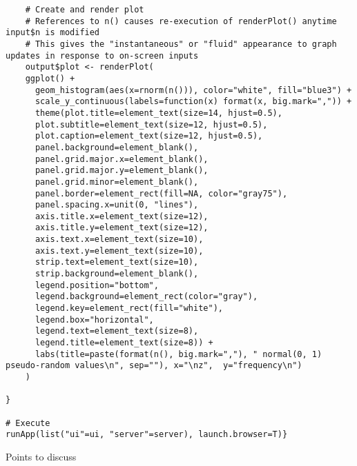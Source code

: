 \documentclass[10pt, letterpaper]{article}
\begin{document}
\begin{spacing}{1.0}
\begin{verbatim}
    # Create and render plot
    # References to n() causes re-execution of renderPlot() anytime input$n is modified
    # This gives the "instantaneous" or "fluid" appearance to graph updates in response to on-screen inputs
    output$plot <- renderPlot(
    ggplot() +
      geom_histogram(aes(x=rnorm(n())), color="white", fill="blue3") +
      scale_y_continuous(labels=function(x) format(x, big.mark=",")) +
      theme(plot.title=element_text(size=14, hjust=0.5),
      plot.subtitle=element_text(size=12, hjust=0.5),
      plot.caption=element_text(size=12, hjust=0.5),
      panel.background=element_blank(),
      panel.grid.major.x=element_blank(),
      panel.grid.major.y=element_blank(),
      panel.grid.minor=element_blank(),
      panel.border=element_rect(fill=NA, color="gray75"),
      panel.spacing.x=unit(0, "lines"),
      axis.title.x=element_text(size=12),
      axis.title.y=element_text(size=12),
      axis.text.x=element_text(size=10),
      axis.text.y=element_text(size=10),
      strip.text=element_text(size=10),
      strip.background=element_blank(),
      legend.position="bottom",
      legend.background=element_rect(color="gray"),
      legend.key=element_rect(fill="white"),
      legend.box="horizontal",
      legend.text=element_text(size=8),
      legend.title=element_text(size=8)) +
      labs(title=paste(format(n(), big.mark=","), " normal(0, 1) pseudo-random values\n", sep=""), x="\nz",  y="frequency\n")
    )
    
}

# Execute
runApp(list("ui"=ui, "server"=server), launch.browser=T)}
\end{verbatim}
\normalsize

Points to discuss


\end{spacing}
\end{document}

